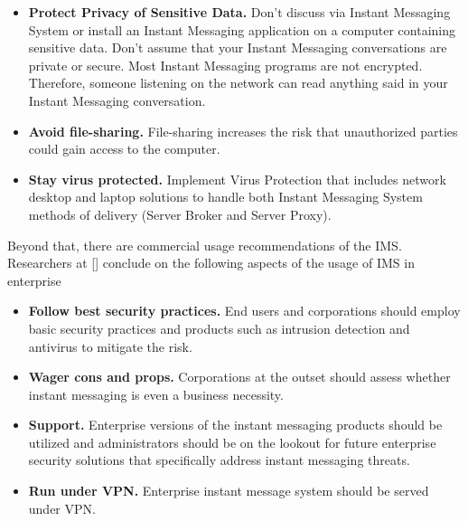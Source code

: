 \begin{itemize}
    \item \textbf{Protect Privacy of Sensitive Data.}
    Don't discuss via Instant Messaging System or install an Instant Messaging application on a computer containing
    sensitive data.
    Don't assume that your Instant Messaging conversations are private or secure.
    Most Instant Messaging programs are not encrypted.
    Therefore, someone listening on the network can read anything said in your Instant Messaging conversation.
    \item \textbf{Avoid file-sharing.}
    File-sharing increases the risk that unauthorized parties could gain access to the computer.
    \item \textbf{Stay virus protected.} Implement Virus Protection that includes network desktop and laptop solutions to handle both Instant Messaging System
    methods of delivery (Server Broker and Server Proxy).
\end{itemize}

Beyond that, there are commercial usage recommendations of the IMS\@.
Researchers at [\cite{hindocha2003malicious}] conclude on the following aspects of the usage of IMS in enterprise
\begin{itemize}
    \item \textbf{Follow best security practices.}
    End users and corporations should employ basic security practices and products such as
    intrusion detection and antivirus to mitigate the risk.
    \item \textbf{Wager cons and props.}
    Corporations at the outset should assess whether instant messaging is even a business necessity.
    \item \textbf{Support.} Enterprise versions of
    the instant messaging products should be utilized and administrators should be on the lookout for
    future enterprise security solutions that specifically address instant messaging threats.
    \item \textbf{Run under VPN.} Enterprise instant message system should be served under VPN\@.
\end{itemize}
